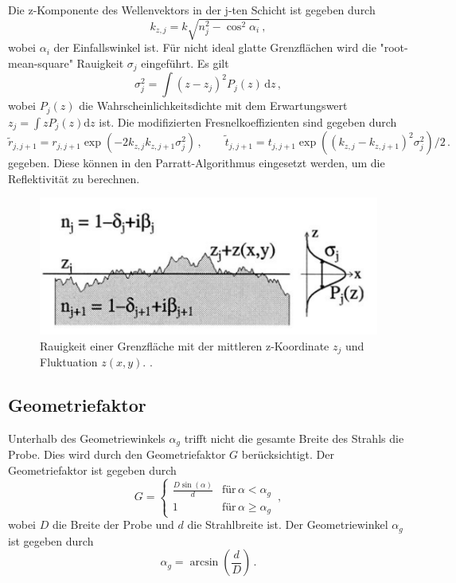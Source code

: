 Die z-Komponente des Wellenvektors in der j-ten Schicht ist gegeben durch
\begin{equation}
    k_{z,j} = k \sqrt{n_j^2 - \cos^2\alpha_i} \, ,
\end{equation}
wobei $\alpha_i$ der Einfallswinkel ist.
Für nicht ideal glatte Grenzflächen wird die "root-mean-square" Rauigkeit $\sigma_j$ eingeführt.
Es gilt
\begin{equation}
   \sigma_j^2 = \int (z-z_j)^2 P_j(z) \, \text{d}z \, ,
\end{equation}
wobei $P_j(z)$ die Wahrscheinlichkeitsdichte mit dem Erwartungswert $z_j = \int z P_j(z)\text{d}z$ ist.
Die modifizierten Fresnelkoeffizienten sind gegeben durch
\begin{equation}
    \tilde{r}_{j,j+1} = r_{j,j+1} \exp{(-2 k_{z,j} k_{z,j+1} \sigma_j^2)} \, , \qquad \tilde{t}_{j,j+1} = t_{j,j+1} \exp{((k_{z,j} - k_{z,j+1})^2 \sigma_j^2)/2} \, .
\end{equation}
gegeben. Diese können in den Parratt-Algorithmus eingesetzt werden, um die Reflektivität zu berechnen.

\begin{figure}
    \centering
    \includegraphics[scale=0.5]{Bilder/sigma.png}
    \caption{Rauigkeit einer Grenzfläche mit der mittleren z-Koordinate $z_j$ und Fluktuation $z(x,y)$. \cite{m-tolan2013}.}
    \label{fig:rauigkeit}
\end{figure}


\subsection{Geometriefaktor} \label{sec:Geometriefaktor}
Unterhalb des Geometriewinkels $\alpha_g$ trifft nicht die gesamte Breite des Strahls die Probe.
Dies wird durch den Geometriefaktor $G$ berücksichtigt.
Der Geometriefaktor ist gegeben durch
\begin{equation}
    G = \begin{cases}
        \frac{D \sin(\alpha)}{d} & \text{für} \, \alpha < \alpha_g \\
        1 & \text{für} \, \alpha \geq \alpha_g
    \end{cases} \, ,
\end{equation}
wobei $D$ die Breite der Probe und $d$ die Strahlbreite ist.
Der Geometriewinkel $\alpha_g$ ist gegeben durch
\begin{equation}
    \alpha_g = \arcsin \left( \frac{d}{D} \right) \, .
\end{equation}
